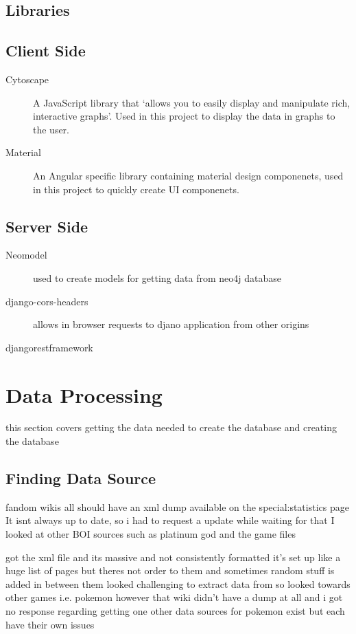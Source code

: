 \subsection{Libraries}
\subsection{Client Side}
\begin{description}
    \item[Cytoscape] A JavaScript library that `allows you to easily display and manipulate rich, interactive graphs'\cite{franzCytoscapeJsGraph2016}. 
    Used in this project to display the data in graphs to the user.
    \item[Material] An Angular specific library containing material design componenets, used in this project to quickly create UI componenets.
\end{description}
\subsection{Server Side}
\begin{description}
    \item[Neomodel] used to create models for getting data from neo4j database
    \item[django-cors-headers] allows in browser requests to djano application from other origins
    \item[djangorestframework] 
\end{description}
\section{Data Processing}
this section covers getting the data needed to create the database and creating the database
\subsection{Finding Data Source}
fandom wikis all should have an xml dump available on the special:statistics page
It isnt always up to date, so i had to request a update
while waiting for that I looked at other BOI sources such as platinum god and the game files

got the xml file and its massive and not consistently formatted
it's set up like a huge list of pages but theres not order to them and sometimes random stuff is added in between them
looked challenging to extract data from so looked towards other games i.e. pokemon
however that wiki didn't have a dump at all and i got no response regarding getting one
other data sources for pokemon exist but each have their own issues

